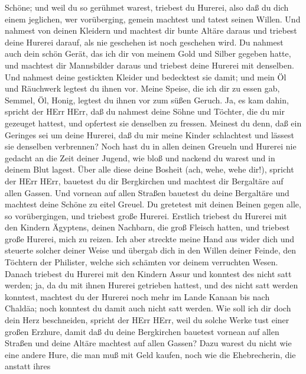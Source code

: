 Schöne; und weil du so gerühmet warest, triebest du Hurerei, also daß du
dich einem jeglichen, wer vorüberging, gemein machtest und tatest seinen
Willen.  Und nahmest von deinen Kleidern und machtest dir
bunte Altäre daraus und triebest deine Hurerei darauf, als nie geschehen
ist noch geschehen wird.  Du nahmest auch dein schön Gerät,
das ich dir von meinem Gold und Silber gegeben hatte, und machtest dir
Mannsbilder daraus und triebest deine Hurerei mit denselben.
 Und nahmest deine gestickten Kleider und bedecktest sie
damit; und mein Öl und Räuchwerk legtest du ihnen vor. 
Meine Speise, die ich dir zu essen gab, Semmel, Öl, Honig, legtest du
ihnen vor zum süßen Geruch. Ja, es kam dahin, spricht der HErr HErr,
 daß du nahmest deine Söhne und Töchter, die du mir
gezeuget hattest, und opfertest sie denselben zu fressen. Meinest du
denn, daß ein Geringes sei um deine Hurerei,  daß du mir
meine Kinder schlachtest und lässest sie denselben verbrennen?
 Noch hast du in allen deinen Greueln und Hurerei nie
gedacht an die Zeit deiner Jugend, wie bloß und nackend du warest und in
deinem Blut lagest.  Über alle diese deine Bosheit (ach,
wehe, wehe dir!), spricht der HErr HErr,  bauetest du dir
Bergkirchen und machtest dir Bergaltäre auf allen Gassen. 
Und vornean auf allen Straßen bauetest du deine Bergaltäre und machtest
deine Schöne zu eitel Greuel. Du gretetest mit deinen Beinen gegen alle,
so vorübergingen, und triebest große Hurerei.  Erstlich
triebest du Hurerei mit den Kindern Ägyptens, deinen Nachbarn, die groß
Fleisch hatten, und triebest große Hurerei, mich zu reizen.
 Ich aber streckte meine Hand aus wider dich und steuerte
solcher deiner Weise und übergab dich in den Willen deiner Feinde, den
Töchtern der Philister, welche sich schämten vor deinem verruchten
Wesen.  Danach triebest du Hurerei mit den Kindern Assur
und konntest des nicht satt werden; ja, da du mit ihnen Hurerei
getrieben hattest, und des nicht satt werden konntest, 
machtest du der Hurerei noch mehr im Lande Kanaan bis nach Chaldäa; noch
konntest du damit auch nicht satt werden.  Wie soll ich dir
doch dein Herz beschneiden, spricht der HErr HErr, weil du solche Werke
tust einer großen Erzhure,  damit daß du deine Bergkirchen
bauetest vornean auf allen Straßen und deine Altäre machtest auf allen
Gassen? Dazu warest du nicht wie eine andere Hure, die man muß mit Geld
kaufen,  noch wie die Ehebrecherin, die anstatt ihres
